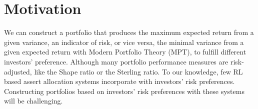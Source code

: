 \section {Motivation}
We can construct a portfolio that produces the maximum expected return from a given variance, an indicator of risk, or vice versa, the minimal variance from a given expected return with Modern Portfolio Theory (MPT), \cite{10.2307/2975974} to fulfill different investors' preference.
Although many portfolio performance measures are risk-adjusted\cite{cogneau2009101}, like the Shape ratio\cite{Sharpe49} or the Sterling ratio\cite{magdon2004maximum}. To our knowledge, few RL based assert allocation systems incorporate with investors' risk preferences. Constructing portfolios based on investors' risk preferences with these systems will be challenging.